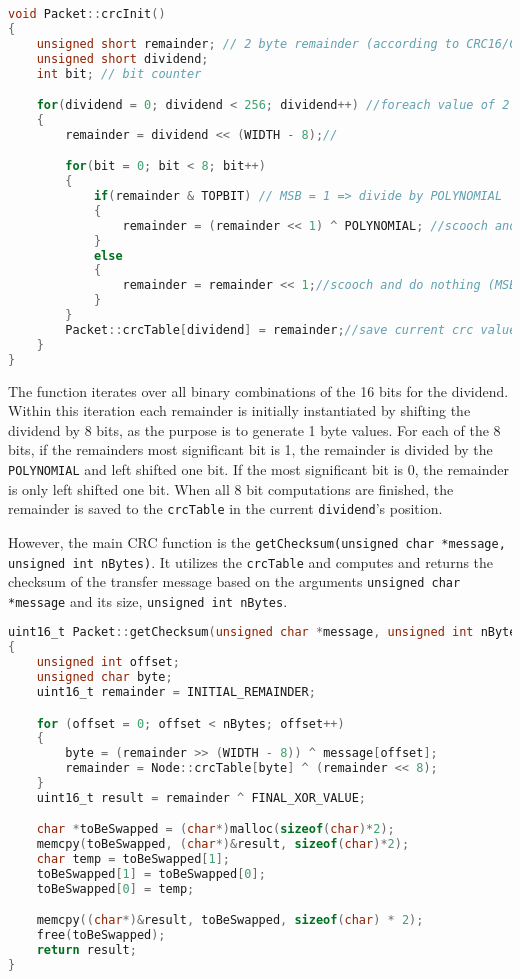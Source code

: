 \begin{lstlisting}[language=C]
void Packet::crcInit()
{
    unsigned short remainder; // 2 byte remainder (according to CRC16/CCITT standard)
    unsigned short dividend; 
    int bit; // bit counter

    for(dividend = 0; dividend < 256; dividend++) //foreach value of 2 bytes/8 bits
    {
        remainder = dividend << (WIDTH - 8);//

        for(bit = 0; bit < 8; bit++)
        {
            if(remainder & TOPBIT) // MSB = 1 => divide by POLYNOMIAL
            {
                remainder = (remainder << 1) ^ POLYNOMIAL; //scooch and divide
            }
            else
            {
		        remainder = remainder << 1;//scooch and do nothing (MSB = 0, move along)
	        }
        }
    	Packet::crcTable[dividend] = remainder;//save current crc value in crcTable
    }
}
\end{lstlisting}

The function iterates over all binary combinations of the 16 bits for the dividend. Within this iteration each remainder is initially instantiated by shifting the dividend by 8 bits, as the purpose is to generate 1 byte values. For each of the 8 bits, if the remainders most significant bit is 1, the remainder is divided by the \texttt{POLYNOMIAL} and left shifted one bit. If the most significant bit is 0, the remainder is only left shifted one bit. When all 8 bit computations are finished, the remainder is saved to the \texttt{crcTable} in the current \texttt{dividend}'s position.

However, the main CRC function is the \texttt{getChecksum(unsigned char *message, unsigned int nBytes)}. It utilizes the \texttt{crcTable} and computes and returns the checksum of the transfer message based on the arguments \texttt{unsigned char *message} and its size, \texttt{unsigned int nBytes}.

\begin{lstlisting}[language=C]
uint16_t Packet::getChecksum(unsigned char *message, unsigned int nBytes)
{
    unsigned int offset;
    unsigned char byte;
    uint16_t remainder = INITIAL_REMAINDER;

    for (offset = 0; offset < nBytes; offset++)
    {
        byte = (remainder >> (WIDTH - 8)) ^ message[offset];
        remainder = Node::crcTable[byte] ^ (remainder << 8);
    }
    uint16_t result = remainder ^ FINAL_XOR_VALUE;

    char *toBeSwapped = (char*)malloc(sizeof(char)*2);
    memcpy(toBeSwapped, (char*)&result, sizeof(char)*2);
    char temp = toBeSwapped[1];
    toBeSwapped[1] = toBeSwapped[0];
    toBeSwapped[0] = temp;

    memcpy((char*)&result, toBeSwapped, sizeof(char) * 2);
    free(toBeSwapped);
    return result;
}
\end{lstlisting}

